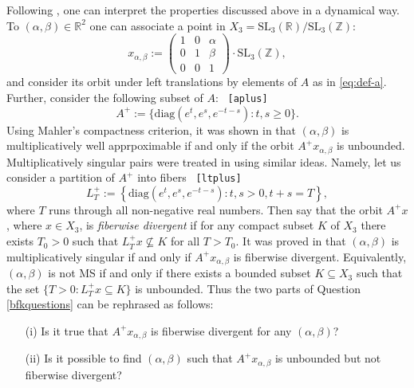 \documentclass[reqno,12pt]{amsart}
\newtheorem{conjecture}[theorem]{Conjecture}
\theoremstyle{definition}
\numberwithin{equation}{section}
\newcommand{\RR}{\mathbb{R}}
\newcommand{\ZZ}{\mathbb{Z}}
\newcommand{\diag}{\mathrm{diag}}
\newcommand{\SL}{\mathrm{SL}}
\newif\ifdraft\drafttrue
\newcommand\eq[2]{{\ifdraft{\ \tt [#1]}\else\ignorespaces\fi}\begin{equation}\label{eq:#1}{#2}\end{equation}}
\newcommand {\equ}[1]     {\eqref{eq:#1}}
\begin{document}
Following \cite{BFK25}, one can interpret the properties discussed above in a dynamical way. To $(\alpha,\beta)\in\RR^2$  one can associate a point in $X_3=\SL_3(\RR)/\SL_3(\ZZ)$:
$$
x_{\alpha,\beta}:=\begin{pmatrix}
    1 &0 &\alpha\\ 0 &1 &\beta \\ 0 &0 &1 
\end{pmatrix}\cdot\SL_3(\ZZ),
$$
and consider its orbit under left translations by elements of %
$A$ 
as in \equ{def-a}.
  Further, consider the following subset of $A$:
\eq{aplus}{A^{+}:=\{\diag(e^t,e^s,e^{-t-s}):t,s\ge0\}.}
Using Mahler's compactness criterion, it was shown in \cite{EKL06} that $(\alpha,\beta)$ is multiplicatively well apprpoximable if and only if the orbit $A^{+}x_{\alpha,\beta}$ is unbounded. 
Multiplicatively singular pairs were treated in \cite{BFK25} using similar ideas. Namely, let us consider a partition of $A^{+}$ into fibers 
\eq{ltplus}{L_T^{+}:=\left\{\diag(e^t,e^s,e^{-t-s}):t,s>0,t+s=T\right\},
}
where $T$ runs through all non-negative real numbers. Then say that the orbit $A^{+}x$, where $x\in X_3$, is {\sl fiberwise divergent} if for any compact subset $K$ of $X_3$   there exists $T_0 > 0$ such that $L_T^+x\not\subseteq K$ for all $T > T_0$.  It was proved in  \cite{BFK25} that $(\alpha,\beta)$ is multiplicatively singular if and only if $A^{+}x_{\alpha,\beta}$ is fiberwise divergent. Equivalently, $(\alpha,\beta)$ is not MS if and only if there exists a bounded subset $K\subseteq X_3$ such that the set $\{T>0: L_T^{+}x\subseteq K\}$ is unbounded. Thus the two parts of Question \ref{bfkquestions} can be rephrased as follows: 
\begin{itemize}
    \item[(i)]  Is it true that $A^{+}x_{\alpha,\beta}$ is fiberwise divergent for any $(\alpha,\beta)$?
\item[(ii)] Is it possible to find $(\alpha,\beta)$ such that    $A^{+}x_{\alpha,\beta}$   is unbounded but not fiberwise divergent? \end{itemize}
\end{document}
